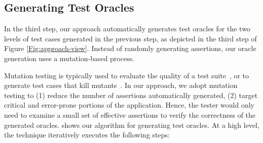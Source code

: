 \subsection{Generating Test Oracles} \label{Sec:oracleGen}
In the third step, our approach automatically generates test oracles for the two levels of test cases generated in the previous step, as depicted in the third step of Figure \ref{Fig:approach-view}. 
Instead of randomly generating assertions, our oracle generation uses a mutation-based process.

Mutation testing is typically used to evaluate the quality of a test suite~\cite{demillo:computer1978}, or to generate test cases that kill mutants~\cite{fraser:tse12}. In our approach, we adopt mutation testing to (1) reduce the number of assertions automatically generated, (2) target critical  and error-prone portions of the application. %
Hence, the tester would only need to examine a small set of effective assertions to verify the correctness of the generated oracles.
%
%
 shows our algorithm for generating test oracles. 
At a high level, the technique iteratively executes the following steps:



